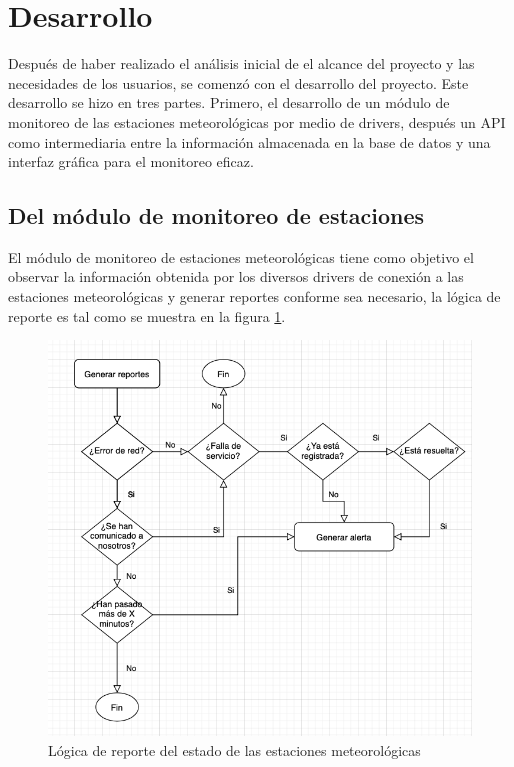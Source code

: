 
\section{Desarrollo}

Después de haber realizado el análisis inicial de el alcance del proyecto y las necesidades de los usuarios, se comenzó con el desarrollo del proyecto. Este desarrollo se hizo en tres partes. Primero, el desarrollo de un módulo de monitoreo de las estaciones meteorológicas por medio de drivers,  después un API como intermediaria entre la información almacenada en la base de datos y una interfaz gráfica para el monitoreo eficaz.

\subsection{Del módulo de monitoreo de estaciones}

El módulo de monitoreo de estaciones meteorológicas tiene como objetivo el observar la información obtenida por los diversos drivers de conexión a las estaciones meteorológicas y generar reportes conforme sea necesario, la lógica de reporte es tal como se muestra en la figura \ref{fig:logica_de_reporte}.


\begin{figure}[!ht]
	\centering
	\includegraphics[width=1\linewidth]{images/diagrams/report_logic.png}
	\caption{Lógica de reporte del estado de las estaciones meteorológicas}
	\label{fig:logica_de_reporte}
\end{figure}


